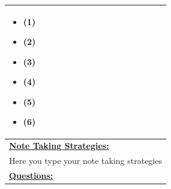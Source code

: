 \documentclass{article}
\begin{document}
\begin{longtable}{ | m{50em} | }
  \begin{itemize}
        \item \footnotesize (1)
        \item \footnotesize (2)
        \item \footnotesize (3)
        \item \footnotesize (4)
        \item \footnotesize (5)
        \item \footnotesize (6)
    \end{itemize}\\
  \hline
  \underline{\textbf{Note Taking Strategies:}}\\

  \footnotesize Here you type your note taking strategies\\
  \hline 
  \underline{\textbf{Questions:}}\\


\end{longtable}
\end{document}
